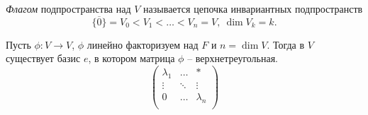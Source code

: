 \begin{definition}
    \textit{Флагом} подпространства над $V$ называется цепочка инвариантных подпространств 
    $$\{ \overline{0} \} = V_0 < V_1 < \ldots < V_n = V, \ \dim V_k = k.$$
\end{definition}

\begin{theorem}
    Пусть $\phi: V \to V$, $\phi$ линейно факторизуем над $F$ и  $n = \dim V$. Тогда в $V$ существует базис $e$, в котором матрица $\phi$ -- верхнетреугольная.
    \begin{equation*}
        \left(
            \begin{array}{ccc}
            \lambda_1 & \dots & * \\
            \vdots & \ddots & \vdots \\
            0 & \dots & \lambda_n \\
            \end{array}
        \right)
    \end{equation*}
\end{theorem}


